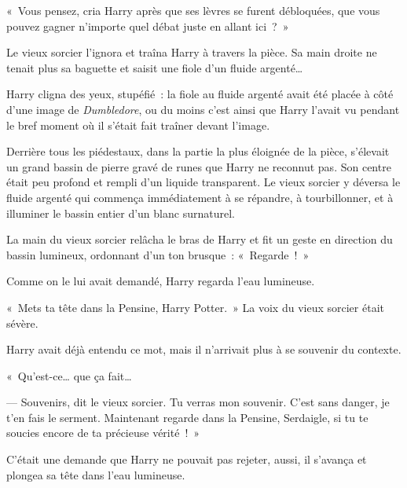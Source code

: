 «~Vous pensez, cria Harry après que ses lèvres se furent débloquées, que vous pouvez gagner n'importe quel débat juste en allant ici~?~»

Le vieux sorcier l'ignora et traîna Harry à travers la pièce. Sa main droite ne tenait plus sa baguette et saisit une fiole d'un fluide argenté…

Harry cligna des yeux, stupéfié~: la fiole au fluide argenté avait été placée à côté d'une image de \emph{Dumbledore}, ou du moins c'est ainsi que Harry l'avait vu pendant le bref moment où il s'était fait traîner devant l'image.

Derrière tous les piédestaux, dans la partie la plus éloignée de la pièce, s'élevait un grand bassin de pierre gravé de runes que Harry ne reconnut pas. Son centre était peu profond et rempli d'un liquide transparent. Le vieux sorcier y déversa le fluide argenté qui commença immédiatement à se répandre, à tourbillonner, et à illuminer le bassin entier d'un blanc surnaturel.

La main du vieux sorcier relâcha le bras de Harry et fit un geste en direction du bassin lumineux, ordonnant d'un ton brusque~: «~Regarde~!~»

Comme on le lui avait demandé, Harry regarda l'eau lumineuse.

«~Mets ta tête dans la Pensine, Harry Potter.~» La voix du vieux sorcier était sévère.

Harry avait déjà entendu ce mot, mais il n'arrivait plus à se souvenir du contexte.

«~Qu'est-ce… que ça fait…

--- Souvenirs, dit le vieux sorcier. Tu verras mon souvenir. C'est sans danger, je t'en fais le serment. Maintenant regarde dans la Pensine, Serdaigle, si tu te soucies encore de ta précieuse vérité~!~»

C'était une demande que Harry ne pouvait pas rejeter, aussi, il s'avança et plongea sa tête dans l'eau lumineuse.
\later

